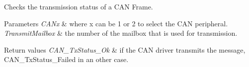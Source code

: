 Checks the transmission status of a C\+A\+N Frame. 


\begin{DoxyParams}{Parameters}
{\em C\+A\+Nx} & where x can be 1 or 2 to select the C\+A\+N peripheral. \\
\hline
{\em Transmit\+Mailbox} & the number of the mailbox that is used for transmission. \\
\hline
\end{DoxyParams}

\begin{DoxyRetVals}{Return values}
{\em C\+A\+N\+\_\+\+Tx\+Status\+\_\+\+Ok} & if the C\+A\+N driver transmits the message, C\+A\+N\+\_\+\+Tx\+Status\+\_\+\+Failed in an other case. \\
\hline
\end{DoxyRetVals}
